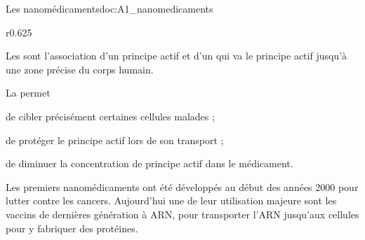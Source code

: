 \begin{doc}{Les nanomédicaments}{doc:A1_nanomedicaments}
  \begin{wrapfigure}[8]{r}{0.625\linewidth}
    \centering
    \vspace*{-10pt}
  \end{wrapfigure}

  Les  sont l'association d'un principe actif et d'un  qui va  le principe actif jusqu'à une zone précise du corps humain.

  \begin{importants}
    La  permet
    \begin{listePoints}
      \item de cibler précisément certaines cellules malades ;
      \item de protéger le principe actif lors de son transport ;
      \item de diminuer la concentration de principe actif dans le médicament.
    \end{listePoints}
  \end{importants}

  Les premiers nanomédicaments ont été développés au début des années 2000 pour lutter contre les cancers.
  Aujourd'hui une de leur utilisation majeure sont les vaccins de dernières génération à ARN, pour transporter l'ARN jusqu'aux cellules pour y fabriquer des protéines.
\end{doc}